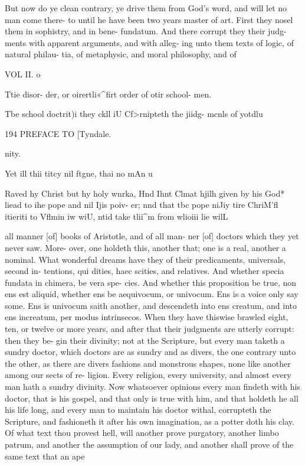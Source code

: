 \documentclass{custom}
\begin{document}
But now do ye clean contrary, ye drive them 
from God's word, and will let no man come there- 
to until he have been two years master of art. 
First they nosel them in sophistry, and in bene- 
fundatum. And there corrupt they their judg- 
ments with apparent arguments, and with alleg- 
ing unto them texts of logic, of natural philau- 
tia, of metaphysic, and moral philosophy, and of 

VOL II. o 

Ttie disor- 
der, or 
oirertli«^firt 
order of 
otir school- 
men. 

Tbe school 
doctrit)i%
they ckll iU 
Cf>rnipteth 
the jiidg- 
mcnls of 
yotdlu 


194 
PREFACE TO 
[Tyndale.

nity. 

Yet ill thii 
titcy nil 
ftgne, thai 
no mAn u 

Raved hy 
Christ but 
hy holy 
wnrka, Hnd 
Ihnt Clmat 
hjilh given 
by his God* 
liead to ihe 
pope and 
nil Ijis poiv- 
er; nnd 
that tbc 
pope niJiy 
tire 
ChriM'fl 
itieriti to 
Vflmin iw 
wiU, ntid 
take tlii^m 
from wlioiii 
lie wilL 

all manner [of] books of Aristotle, and of all man- 
ner [of] doctors which they yet never saw. More- 
over, one holdeth this, another that; one is a real, 
another a nominal. What wonderful dreams have 
they of their predicaments, universals, second in- 
tentions, qui dities, haec scities, and relatives. And 
whether specia fundata in chimera, be vera spe- 
cies. And whether this proposition be true, non 
ens est aliquid, whether ens be aequivocum, or 
univocum. Ens is a voice only say some. Ens 
is univocum saith another, and descendeth into 
ens creatum, and into ens increatum, per modus 
intrinsecos. When they have thiswise brawled 
eight, ten, or twelve or more years, and after that 
their judgments are utterly corrupt: then they be- 
gin their divinity; not at the Scripture, but every 
man taketh a sundry doctor, which doctors are as 
sundry and as divers, the one contrary unto the 
other, as there are divers fashions and monstrous 
shapes, none like another among our sects of re- 
ligion. Every religion, every university, and 
almost every man hath a sundry divinity. Now 
whatsoever opinions every man findeth with 
his doctor, that is his gospel, and that only 
is true with him, and that holdeth he all his 
life long, and every man to maintain his doctor 
withal, corrupteth the Scripture, and fashioneth 
it after his own imagination, as a potter doth his 
clay. Of what text thou provest hell, will 
another prove purgatory, another limbo patrum, 
and another the assumption of our lady, and 
another shall prove of the same text that an ape 
\end{document}
